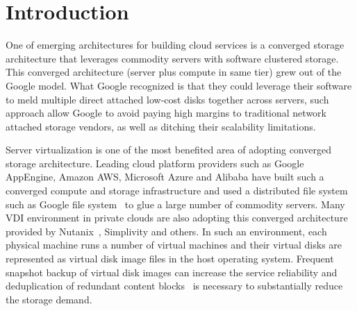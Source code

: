 \section{Introduction}

One of emerging architectures for building cloud services
is a converged storage architecture that leverages commodity servers with software clustered storage.
This converged architecture (server plus compute in same tier) grew out of the Google model. 
What Google recognized is that they could leverage their software to 
meld multiple direct attached low-cost disks together across servers, 
such approach allow Google to avoid paying high margins to traditional network attached storage vendors,
as well as ditching their scalability limitations. 

Server virtualization is one of the most benefited area of adopting converged storage architecture.
Leading cloud platform providers such as Google AppEngine, Amazon AWS, 
Microsoft Azure and Alibaba have built such a converged compute and storage infrastructure and used
a distributed file system such as Google file system~\cite{googlefs03,hdfs10}
to glue a large number of commodity servers.
Many VDI environment in private clouds are also adopting this converged architecture 
provided by Nutanix~\cite{NutanixPaper}, Simplivity and others. 
In such an environment,
each physical machine runs a number  of virtual machines 
and their virtual disks are represented as virtual disk image files in the host operating system.
Frequent snapshot backup of virtual disk images  can increase  the service reliability
and deduplication of redundant content blocks~\cite{venti02,bottleneck08}
 is necessary to substantially reduce the storage demand.
 


